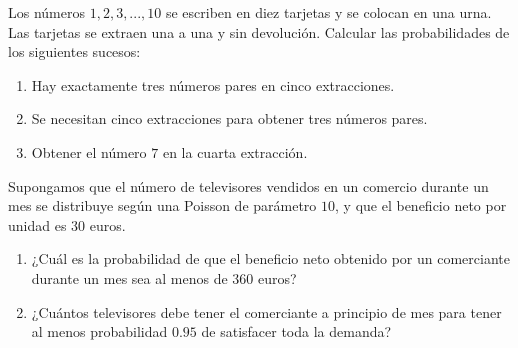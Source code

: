 \begin{ejercicio}
    Los números $1,2,3,...,10$ se escriben en diez tarjetas y se colocan en una urna. Las tarjetas se
    extraen una a una y sin devolución. Calcular las probabilidades de los siguientes sucesos:
    \begin{enumerate}
        \item Hay exactamente tres números pares en cinco extracciones.
        \item Se necesitan cinco extracciones para obtener tres números pares.
        \item Obtener el número $7$ en la cuarta extracción.
    \end{enumerate}



\end{ejercicio}

\begin{ejercicio}
    Supongamos que el número de televisores vendidos en un comercio durante un mes se distribuye
    según una Poisson de parámetro $10$, y que el beneficio neto por unidad es $30$ euros.
    \begin{enumerate}
        \item ¿Cuál es la probabilidad de que el beneficio neto obtenido por un comerciante durante un mes
        sea al menos de $360$ euros?
        \item ¿Cuántos televisores debe tener el comerciante a principio de mes para tener al menos probabilidad $0.95$ de satisfacer toda la demanda?
    \end{enumerate}

\end{ejercicio}

